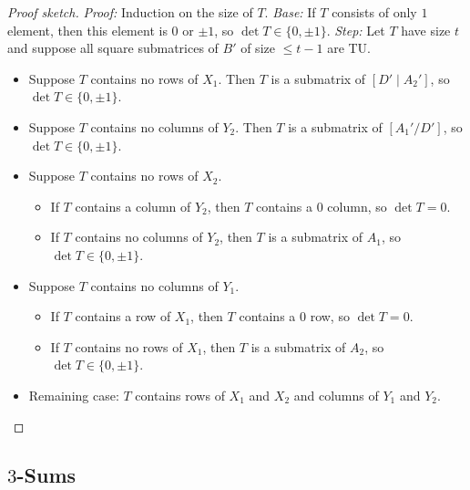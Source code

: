 \begin{proof}[Proof sketch]
  \emph{Proof:} Induction on the size of $T$.
  \emph{Base:} If $T$ consists of only $1$ element, then this element is $0$ or $\pm 1$, so $\det T \in \{0, \pm 1\}$.
  \emph{Step:} Let $T$ have size $t$ and suppose all square submatrices of $B'$ of size $\leq t - 1$ are TU.
  \begin{itemize}
    \item Suppose $T$ contains no rows of $X_{1}$. Then $T$ is a submatrix of $\left[D' \mid A_{2}' \right]$, so $\det T \in \{0, \pm 1\}$.
    \item Suppose $T$ contains no columns of $Y_{2}$. Then $T$ is a submatrix of $\left[ A_{1}' / D' \right]$, so $\det T \in \{0, \pm 1\}$.
    \item Suppose $T$ contains no rows of $X_{2}$.
    \begin{itemize}
      \item If $T$ contains a column of $Y_{2}$, then $T$ contains a $0$ column, so $\det T = 0$.
      \item If $T$ contains no columns of $Y_{2}$, then $T$ is a submatrix of $A_{1}$, so $\det T \in \{0, \pm 1\}$.
    \end{itemize}
    \item Suppose $T$ contains no columns of $Y_{1}$.
    \begin{itemize}
      \item If $T$ contains a row of $X_{1}$, then $T$ contains a $0$ row, so $\det T = 0$.
      \item If $T$ contains no rows of $X_{1}$, then $T$ is a submatrix of $A_{2}$, so $\det T \in \{0, \pm 1\}$.
    \end{itemize}
    \item Remaining case: $T$ contains rows of $X_{1}$ and $X_{2}$ and columns of $Y_{1}$ and $Y_{2}$.
  \end{itemize}
\end{proof}


\subsection{$3$-Sums}

\begin{definition}
  \label{def:code_3_sum_of_matrices}
\end{definition}

\begin{definition}
  \label{def:code_3_sum_of_binary}
\end{definition}

\begin{lemma}
  \label{lem:code_3_sep_3_sum}
\end{lemma}

\begin{lemma}
  \label{lem:code_3_sum_of_regular}
\end{lemma}
